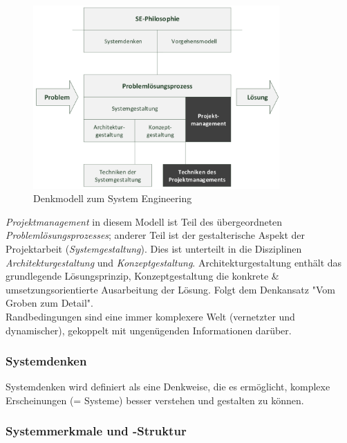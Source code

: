 \documentclass[a4paper]{article}
\begin{document}
	\begin{figure}[!htb]
		\centering
		\includegraphics[height=7cm]{img/pm/denkmodell.png}
		\caption{Denkmodell zum System Engineering}
		\label{fig:pm_se_denkmodell}
	\end{figure}
\noindent
	\textit{Projektmanagement} in diesem Modell ist Teil des übergeordneten \textit{Problemlösungsprozesses}; 
	anderer Teil ist der gestalterische Aspekt der Projektarbeit (\textit{Systemgestaltung}).
	Dies ist unterteilt in die Disziplinen \textit{Architekturgestaltung} und \textit{Konzeptgestaltung}.
	Architekturgestaltung enthält das grundlegende Lösungsprinzip, Konzeptgestaltung die konkrete \& umsetzungsorientierte Ausarbeitung der Lösung.
	Folgt dem Denkansatz "Vom Groben zum Detail".\\
	Randbedingungen sind eine immer komplexere Welt (vernetzter und dynamischer), gekoppelt mit ungenügenden Informationen darüber.
	
		\subsubsection{Systemdenken}
		
		Systemdenken wird definiert als eine Denkweise, die es ermöglicht, komplexe Erscheinungen  (= Systeme) besser verstehen und gestalten zu können. 
	
		\subsubsection{Systemmerkmale und -Struktur}
	
\end{document}
